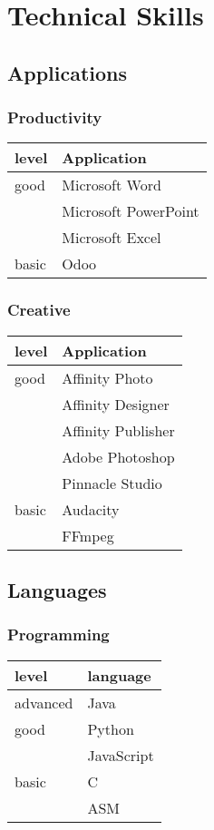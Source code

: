 \documentclass{article}
\begin{document}
\section{Technical Skills}
\begin{multicols}{2}
\subsection{Applications}
\subsubsection{Productivity}
\begin{tabular}{| m{5em} | m{12em} |}
    \hline
    \textbf{level} &  \textbf{Application} \\
    \hline
    good & Microsoft Word\\
    & Microsoft PowerPoint\\
    & Microsoft Excel\\
    \hline
    basic & Odoo\\
    \hline
\end{tabular}

\subsubsection{Creative}
\begin{tabular}{| m{5em} | m{12em} |}
    \hline
    \textbf{level} &  \textbf{Application} \\
    \hline
    good & Affinity Photo\\
    & Affinity Designer\\
    & Affinity Publisher\\
    & Adobe Photoshop\\
    & Pinnacle Studio\\
    \hline
    basic & Audacity\\
        & FFmpeg\\
    \hline
\end{tabular}
\subsection{Languages}

\subsubsection{Programming}
\begin{tabular}{| m{5em} | m{12em} |}
    \hline
    \textbf{level} &  \textbf{language} \\
    \hline
    advanced & Java \\
    \hline
    good & Python\\
    & JavaScript\\
    \hline
    basic &  C\\
    & ASM \\
    \hline
\end{tabular}

\end{multicols}
\end{document}
